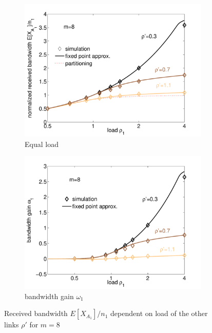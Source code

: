 \begin{figure}[tb]
\centering
\begin{subfigure}{.49\textwidth}
 \centering
 \includegraphics[width=\linewidth]{aggregation/performance_model/figures/fp_bw_m8}
 \caption{Equal load}
 \label{fig:bw_m8}
\end{subfigure}%
\begin{subfigure}{.49\textwidth}
 \centering
 \includegraphics[width=\linewidth]{aggregation/performance_model/figures/fp_bwgain_m8}
 \caption{bandwidth gain $\omega_1$}
 \label{fig:bwgain_m8}
\end{subfigure}
\caption{Received bandwidth $E[X_{A_1}]/n_1$ dependent on load of the other links $\rho'$ for $m=8$}
\label{fig:m8}
\end{figure}

